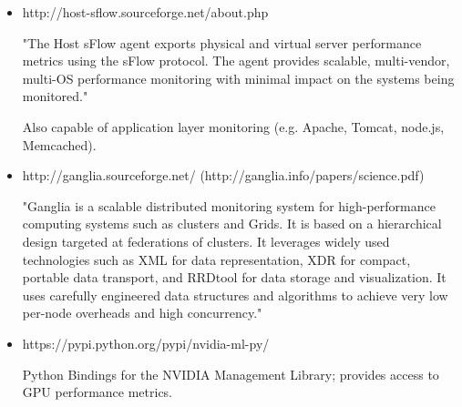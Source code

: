 \begin{itemize}

\item http://host-sflow.sourceforge.net/about.php

"The Host sFlow agent exports physical and virtual server performance metrics using the sFlow protocol. The agent
provides scalable, multi-vendor, multi-OS performance monitoring with minimal impact on the systems being monitored."

Also capable of application layer monitoring (e.g. Apache, Tomcat, node.js, Memcached).

\item http://ganglia.sourceforge.net/ (http://ganglia.info/papers/science.pdf)

"Ganglia is a scalable distributed monitoring system for high-performance computing systems such as clusters and
Grids. It is based on a hierarchical design targeted at federations of clusters. It leverages widely used technologies
such as XML for data representation, XDR for compact, portable data transport, and RRDtool for data storage and
visualization. It uses carefully engineered data structures and algorithms to achieve very low per-node overheads and
high concurrency."

\item https://pypi.python.org/pypi/nvidia-ml-py/

Python Bindings for the NVIDIA Management Library; provides access to GPU performance metrics.

\end{itemize}
